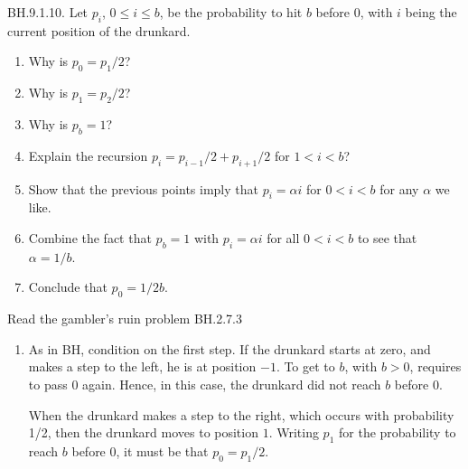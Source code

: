 \begin{exercise}
  BH.9.1.10.  Let $p_i$, $0\leq i\leq b$, be the probability to hit $b$ before $0$, with $i$ being the current position of the drunkard.
\begin{enumerate}
\item Why is $p_0=p_1/2$?
\item Why is $p_1=p_2/2$?
\item Why is $p_{b}=1$?
\item Explain the recursion $p_i=p_{i-1}/2 + p_{i+1}/2$ for $1 < i <b$?
\item Show that the previous points imply that $p_i =  \alpha i$ for $0<i<b$ for any $\alpha$ we like.
\item Combine the fact that $p_{b}=1$ with $p_{i} = \alpha i$ for all $0<i<b$ to see that $\alpha=1/b$.
\item Conclude that $p_0=1/2b$.
\end{enumerate}
\begin{hint}
  Read the gambler's ruin problem BH.2.7.3
\end{hint}

\begin{solution}
  \begin{enumerate}
    \item As in BH, condition on the first step. If the drunkard starts at zero, and makes a step to the left, he is at position $-1$. To get to $b$, with $b>0$, requires to pass $0$ again. Hence, in this case, the drunkard did not reach $b$ before 0.

    When the drunkard makes a step to the right, which occurs with probability 1/2, then the drunkard moves to position $1$. Writing $p_{1}$ for the probability to reach $b$ before $0$, it must be that $p_0 = p_1/2$.


\end{enumerate}
\end{solution}
\end{exercise}
